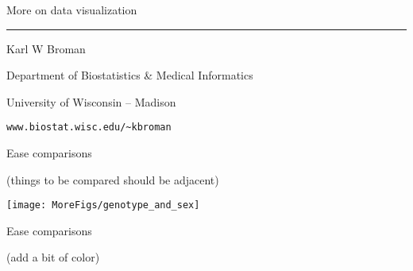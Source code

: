 \documentclass[12pt]{article}\usepackage[]{graphicx}\usepackage[]{color}
\makeatletter
\def\maxwidth{ %
  \ifdim\Gin@nat@width>\linewidth
    \linewidth
  \else
    \Gin@nat@width
  \fi
}
\newenvironment{knitrout}{}{} %
\newcommand{\titlesize}{\fontsize{40}{50} \selectfont}
\newcommand{\headsize}{\fontsize{35}{35} \selectfont}
\newcommand{\textsize}{\fontsize{30}{35} \selectfont}
\newcommand{\smallersize}{\fontsize{20}{25} \selectfont}
\makeatother
\begin{document}
\thispagestyle{empty}

\begin{center}
\titlesize \color{myyellow}

\vspace*{29.5mm}

{\headsize More on data visualization}

\vspace*{9.5mm}

\color{mypink}
\rule{10in}{1mm}

\vspace{10mm}

\textsize \color{myblue}
Karl W Broman
\vspace{5mm}

{\smallersize Department of Biostatistics \& Medical Informatics

University of Wisconsin -- Madison
\vspace{20mm}


\verb|www.biostat.wisc.edu/~kbroman|
}

\end{center}


\newpage


\headsize \color{myyellow}
\hfill
\begin{minipage}{6.25in}
\centering
Ease comparisons

\bigskip

\color{myblue} \smallersize
(things to be compared should be adjacent)
\end{minipage}

\vspace{10mm}

\begin{knitrout}
\color{fgcolor}

{\centering \texttt{[image: MoreFigs/genotype\_and\_sex]} 

}



\end{knitrout}









\newpage


\headsize \color{myyellow}
\hfill
\begin{minipage}{6.25in}
\centering
Ease comparisons

\bigskip

\color{myblue} \smallersize
(add a bit of color)
\end{minipage}
\end{document}
